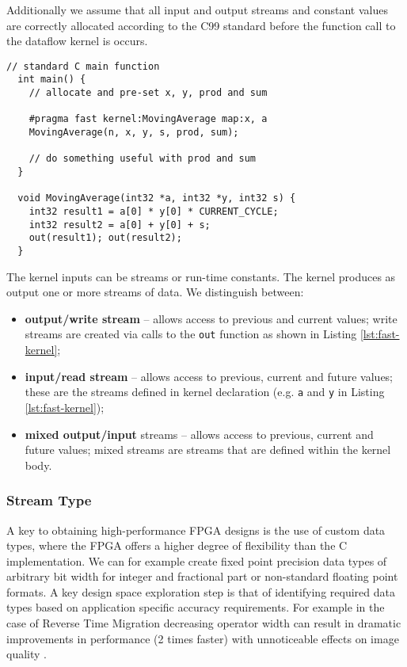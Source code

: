 Additionally we assume that all input and output streams and constant
values are correctly allocated according to the C99 standard before
the function call to the dataflow kernel is occurs.

\begin{lstlisting}[caption={Simple \FAST{} dataflow kernel.}, label={lst:fast-kernel}]
  // standard C main function
  int main() {
    // allocate and pre-set x, y, prod and sum

    #pragma fast kernel:MovingAverage map:x, a
    MovingAverage(n, x, y, s, prod, sum);

    // do something useful with prod and sum
  }

  void MovingAverage(int32 *a, int32 *y, int32 s) {
    int32 result1 = a[0] * y[0] * CURRENT_CYCLE;
    int32 result2 = a[0] + y[0] + s;
    out(result1); out(result2);
  }
\end{lstlisting}

The kernel inputs can be streams or run-time constants. The kernel
produces as output one or more streams of data. We distinguish between:

\begin{itemize}
\item \textbf{output/write stream}  -- allows access to previous and
  current values; write streams are created via calls to the
  \texttt{out} function as shown in Listing \ref{lst:fast-kernel};
\item \textbf{input/read stream} -- allows access to previous, current
  and future values; these are the streams defined in kernel
  declaration (e.g. \texttt{a} and \texttt{y} in Listing
  \ref{lst:fast-kernel});
\item \textbf{mixed output/input} streams -- allows access to
  previous, current and future values; mixed streams are streams that
  are defined within the kernel body.
\end{itemize}

\subsubsection{Stream Type}
A key to obtaining high-performance FPGA designs is the use of custom
data types, where the FPGA offers a higher degree of flexibility than
the C implementation. We can for example create fixed point precision
data types of arbitrary bit width for integer and fractional part or
non-standard floating point formats. A key design space exploration
step is that of identifying required data types based on application
specific accuracy requirements. For example in the case of Reverse
Time Migration decreasing operator width can result in dramatic
improvements in performance (2 times faster) with unnoticeable effects
on image quality \cite{hfu2010accelerating}.

